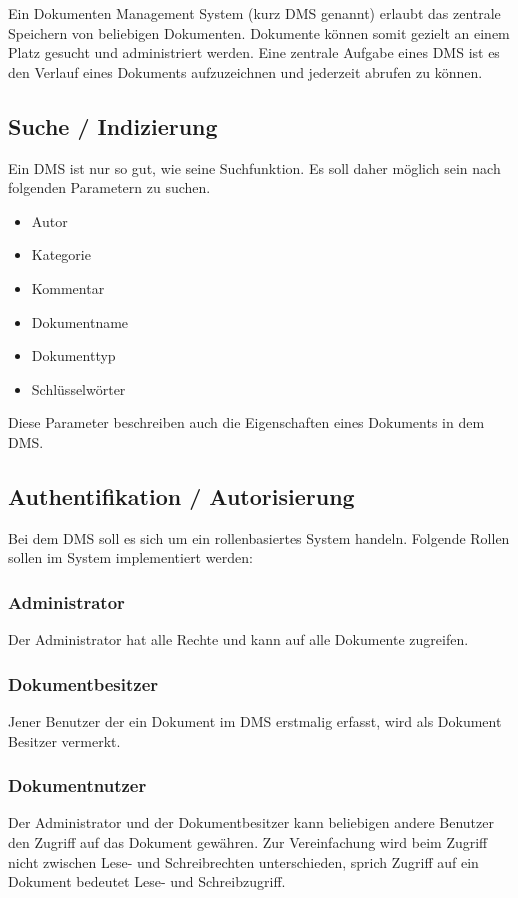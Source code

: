\documentclass[11pt, a4paper]{article}
\begin{document}
Ein Dokumenten Management System (kurz DMS genannt) erlaubt das zentrale Speichern von beliebigen Dokumenten. Dokumente können somit gezielt an einem Platz gesucht und administriert werden. Eine zentrale Aufgabe eines DMS ist es den Verlauf eines Dokuments aufzuzeichnen und jederzeit abrufen zu können.

\subsection*{Suche / Indizierung}

Ein DMS ist nur so gut, wie seine Suchfunktion. Es soll daher möglich sein nach folgenden Parametern zu suchen.

\begin{itemize}
\item Autor
\item Kategorie
\item Kommentar
\item Dokumentname
\item Dokumenttyp
\item Schlüsselwörter
\end{itemize}
Diese Parameter beschreiben auch die Eigenschaften eines Dokuments in dem DMS.

\subsection*{Authentifikation / Autorisierung}

Bei dem DMS soll es sich um ein rollenbasiertes System handeln. Folgende Rollen sollen im System implementiert werden:

\subsubsection*{Administrator}
Der Administrator hat alle Rechte und kann auf alle Dokumente zugreifen.

\subsubsection*{Dokumentbesitzer}
Jener Benutzer der ein Dokument im DMS erstmalig erfasst, wird als Dokument Besitzer vermerkt.

\subsubsection*{Dokumentnutzer}
Der Administrator und der Dokumentbesitzer kann beliebigen andere Benutzer den Zugriff auf das Dokument gewähren.
Zur Vereinfachung wird beim Zugriff nicht zwischen Lese- und Schreibrechten unterschieden, sprich Zugriff auf ein Dokument bedeutet Lese- und Schreibzugriff.
\end{document}
